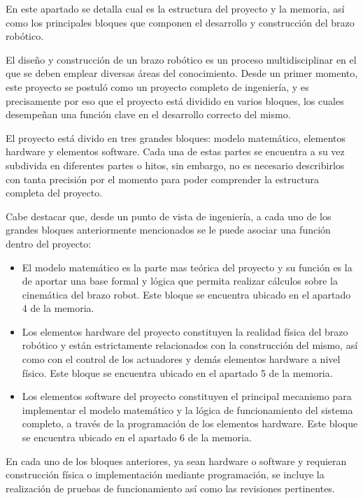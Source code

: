 En este apartado se detalla cual es la estructura del proyecto y la memoria, así como los principales bloques que componen el desarrollo y construcción del brazo robótico.

El diseño y construcción de un brazo robótico es un proceso multidisciplinar en el que se deben emplear diversas áreas del conocimiento. Desde un primer momento, este proyecto se postuló como un proyecto completo de ingeniería, y es precisamente por eso que el proyecto está dividido en varios bloques, los cuales desempeñan una función clave en el desarrollo correcto del mismo.

El proyecto está divido en tres grandes bloques: modelo matemático, elementos hardware y elementos software. Cada una de estas partes se encuentra a su vez subdivida en diferentes partes o hitos, sin embargo, no es necesario describirlos con tanta precisión por el momento para poder comprender la estructura completa del proyecto.

Cabe destacar que, desde un punto de vista de ingeniería, a cada uno de los grandes bloques anteriormente mencionados se le puede asociar una función dentro del proyecto:
\begin{itemize}
    \item El modelo matemático es la parte mas teórica del proyecto y su función es la de aportar una base formal y lógica que permita realizar cálculos sobre la cinemática del brazo robot. Este bloque se encuentra ubicado en el apartado 4 de la memoria.
    
    \item Los elementos hardware del proyecto constituyen la realidad física del brazo robótico y están estrictamente  relacionados con la construcción del mismo, así como con el control de los actuadores y demás elementos hardware a nivel físico. Este bloque se encuentra ubicado en el apartado 5 de la memoria.
    
    \item Los elementos software del proyecto constituyen el principal mecanismo para implementar el modelo matemático y la lógica de funcionamiento del sistema completo, a través de la programación de los elementos hardware. Este bloque se encuentra ubicado en el apartado 6 de la memoria.
\end{itemize}

En cada uno de los bloques anteriores, ya sean hardware o software y requieran construcción física o implementación mediante programación, se incluye la  realización de pruebas de funcionamiento así como las revisiones pertinentes.

